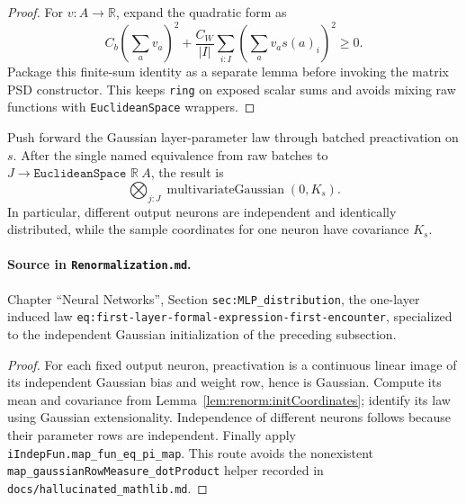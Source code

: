 \begin{proof}
For $v:A\to\mathbb R$, expand the quadratic form as
\[
 C_b\left(\sum_a v_a\right)^2
 +\frac{C_W}{|I|}\sum_{i:I}\left(\sum_a v_as(a)_i\right)^2\ge0.
\]
Package this finite-sum identity as a separate lemma before invoking the matrix PSD constructor.
This keeps \texttt{ring} on exposed scalar sums and avoids mixing raw functions with
\texttt{EuclideanSpace} wrappers.
\end{proof}

\begin{theorem}
\label{thm:renorm:gaussianLayerLaw}
Push forward the Gaussian layer-parameter law through batched preactivation on $s$.  After the
single named equivalence from raw batches to
$J\to\texttt{EuclideanSpace }\mathbb R\ A$, the result is
\[
  \bigotimes_{j:J}\operatorname{multivariateGaussian}(0,K_s).
\]
In particular, different output neurons are independent and identically distributed, while the
sample coordinates for one neuron have covariance $K_s$.

\paragraph{Source in \texttt{Renormalization.md}.}
Chapter ``Neural Networks'', Section \texttt{sec:MLP\_distribution}, the one-layer induced law
\texttt{eq:first-layer-formal-expression-first-encounter}, specialized to the independent Gaussian
initialization of the preceding subsection.
\end{theorem}

\begin{proof}
For each fixed output neuron, preactivation is a continuous linear image of its independent
Gaussian bias and weight row, hence is Gaussian.  Compute its mean and covariance from
Lemma~\ref{lem:renorm:initCoordinates}; identify its law using Gaussian extensionality.  Independence
of different neurons follows because their parameter rows are independent.  Finally apply
\texttt{iIndepFun.map\_fun\_eq\_pi\_map}.  This route avoids the nonexistent
\texttt{map\_gaussianRowMeasure\_dotProduct} helper recorded in
\texttt{docs/hallucinated\_mathlib.md}.
\end{proof}

